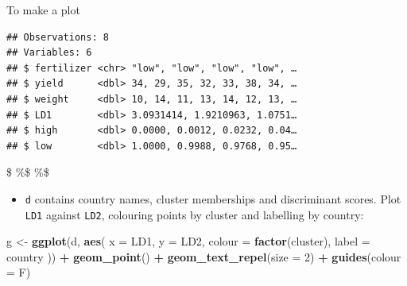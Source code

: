 \documentclass[ignorenonframetext,]{beamer}
\newenvironment{Shaded}{\begin{snugshade}}{\end{snugshade}}
\newcommand{\DataTypeTok}[1]{\textcolor[rgb]{0.13,0.29,0.53}{#1}}
\newcommand{\DecValTok}[1]{\textcolor[rgb]{0.00,0.00,0.81}{#1}}
\newcommand{\KeywordTok}[1]{\textcolor[rgb]{0.13,0.29,0.53}{\textbf{#1}}}
\newcommand{\NormalTok}[1]{#1}
\newcommand{\OperatorTok}[1]{\textcolor[rgb]{0.81,0.36,0.00}{\textbf{#1}}}
\newcommand{\StringTok}[1]{\textcolor[rgb]{0.31,0.60,0.02}{#1}}
\providecommand{\tightlist}{%
  \setlength{\itemsep}{0pt}\setlength{\parskip}{0pt}}
\begin{document}
\begin{frame}[fragile]{To make a plot}
\begin{verbatim}
## Observations: 8
## Variables: 6
## $ fertilizer <chr> "low", "low", "low", "low", …
## $ yield      <dbl> 34, 29, 35, 32, 33, 38, 34, …
## $ weight     <dbl> 10, 14, 11, 13, 14, 12, 13, …
## $ LD1        <dbl> 3.0931414, 1.9210963, 1.0751…
## $ high       <dbl> 0.0000, 0.0012, 0.0232, 0.04…
## $ low        <dbl> 1.0000, 0.9988, 0.9768, 0.95…
\end{verbatim}

\$ \%\$ \%\$

\begin{itemize}
\tightlist
\item
  \texttt{d} contains country names, cluster memberships and
  discriminant scores. Plot \texttt{LD1} against \texttt{LD2}, colouring
  points by cluster and labelling by country:
\end{itemize}

\begin{Shaded}
\begin{Highlighting}[]
\NormalTok{g <-}\StringTok{ }\KeywordTok{ggplot}\NormalTok{(d, }\KeywordTok{aes}\NormalTok{(}
  \DataTypeTok{x =}\NormalTok{ LD1, }\DataTypeTok{y =}\NormalTok{ LD2, }\DataTypeTok{colour =} \KeywordTok{factor}\NormalTok{(cluster),}
  \DataTypeTok{label =}\NormalTok{ country}
\NormalTok{)) }\OperatorTok{+}\StringTok{ }\KeywordTok{geom_point}\NormalTok{() }\OperatorTok{+}
\StringTok{  }\KeywordTok{geom_text_repel}\NormalTok{(}\DataTypeTok{size =} \DecValTok{2}\NormalTok{) }\OperatorTok{+}\StringTok{ }\KeywordTok{guides}\NormalTok{(}\DataTypeTok{colour =}\NormalTok{ F)}
\end{Highlighting}
\end{Shaded}

\end{frame}
\end{document}
